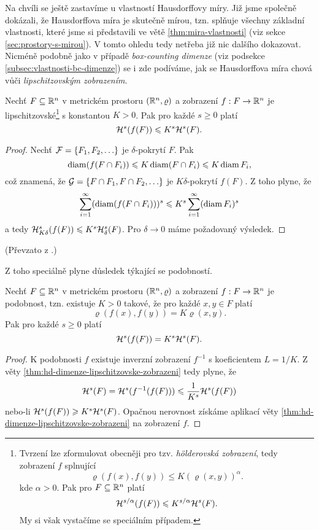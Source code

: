 Na chvíli se ještě zastavíme u vlastností Hausdorffovy míry. Již jsme společně dokázali, že Hausdorffova míra je skutečně mírou, tzn. splňuje všechny základní vlastnosti, které jsme si představili ve větě \ref{thm:mira-vlastnosti} (viz sekce \ref{sec:prostory-s-mirou}). V tomto ohledu tedy netřeba již nic dalšího dokazovat. Nicméně podobně jako v případě \emph{box-counting dimenze} (viz podsekce \ref{subsec:vlastnosti-bc-dimenze}) se i zde podíváme, jak se Hausdorffova míra chová vůči \emph{lipschitzovským zobrazením}.
\begin{theorem}\label{thm:hd-dimenze-lipschitzovske-zobrazeni}
    Nechť $F\subseteq\R^n$ v metrickém prostoru $(\R^n,\varrho)$ a zobrazení $\mapping{f}{F}{\R^n}$ je lipschitzovské\footnote{Tvrzení lze zformulovat obecněji pro tzv. \emph{hölderovská zobrazení}, tedy zobrazení $f$ splnující
    \[\varrho(f(x),f(y))\leqslant K(\varrho(x,y))^\alpha.\]
    kde $\alpha>0$. Pak pro $F\subseteq\R^n$ platí
    \[\hausdorffmeasure{s/\alpha}(f(F))\leqslant K^{s/\alpha}\hausdorffmeasure{s}(F).\]
    My si však vystačíme se speciálním případem.} s konstantou $K>0$. Pak pro každé $s\geqslant 0$ platí
    \[\hausdorffmeasure{s}(f(F))\leqslant K^s\hausdorffmeasure{s}(F).\]
\end{theorem}
\begin{proof}
    Nechť $\mathcal{F}=\set{F_1,F_2,\ldots}$ je $\delta$-pokrytí $F$. Pak
    \[\diam(f(F\cap F_i))\leqslant K\diam(F\cap F_i)\leqslant K\diam{F_i},\]
    což znamená, že $\mathcal{G}=\set{F\cap F_1,F\cap F_2,\ldots}$ je $K\delta$-pokrytí $f(F)$. Z toho plyne, že
    \[\sum_{i=1}^{\infty}(\diam(f(F\cap F_i)))^s\leqslant K^s\sum_{i=1}^{\infty}(\diam{F_i})^s\]
    a tedy $\hausdorffdeltameasure{s}{K\delta}(f(F))\leqslant K^s\hausdorffdeltameasure{s}{\delta}(F)$. Pro $\delta\to 0$ máme požadovaný výsledek.
\end{proof}
(Převzato z \citep[str. 46]{Falconer2014}.)

Z toho speciálně plyne důsledek týkající se podobností.
\begin{corollary}\label{cor:hd-dimenze-podobnost}
    Nechť $F\subseteq\R^n$ v metrickém prostoru $(\R^n,\varrho)$ a zobrazení $\mapping{f}{F}{\R^n}$ je podobnost, tzn. existuje $K>0$ takové, že pro každé $x,y\in F$ platí
    \[\varrho(f(x),f(y))=K\varrho(x,y).\]
    Pak pro každé $s\geqslant 0$ platí
    \[\hausdorffmeasure{s}(f(F))=K^s\hausdorffmeasure{s}(F).\]
\end{corollary}
\begin{proof}
    K podobnosti $f$ existuje inverzní zobrazení $f^{-1}$ s koeficientem $L=1/K$. Z věty \ref{thm:hd-dimenze-lipschitzovske-zobrazeni} tedy plyne, že
    \[\hausdorffmeasure{s}(F)=\hausdorffmeasure{s}(f^{-1}(f(F)))\leqslant\dfrac{1}{K^s}\hausdorffmeasure{s}(f(F))\]
    nebo-li $\hausdorffmeasure{s}(f(F))\geqslant K^s\hausdorffmeasure{s}(F)$. Opačnou nerovnost získáme aplikací věty \ref{thm:hd-dimenze-lipschitzovske-zobrazeni} na zobrazení $f$.
\end{proof}

